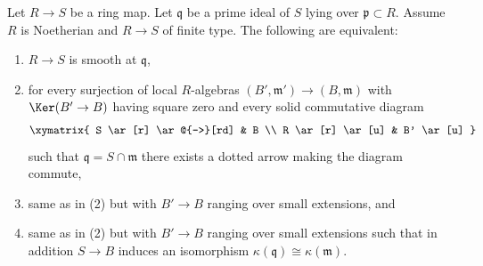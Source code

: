 %
\begin{lemma}
\label{lemma-smooth-test-artinian}
Let $R \to S$ be a ring map. Let $\mathfrak q$ be a prime ideal of
$S$ lying over $\mathfrak p \subset R$. Assume $R$ is Noetherian
and $R \to S$ of finite type.
The following are equivalent:
\begin{enumerate}
\item $R \to S$ is smooth at $\mathfrak q$,
\item for every surjection of local $R$-algebras
$(B', \mathfrak m') \to (B, \mathfrak m)$
with $\Ker(B' \to B)$ having square zero
and every solid commutative diagram
$$
\xymatrix{
S \ar[r] \ar@{-->}[rd] & B \\
R \ar[r] \ar[u] & B' \ar[u]
}
$$
such that $\mathfrak q = S \cap \mathfrak m$ there exists a dotted
arrow making the diagram commute,
\item same as in (2) but with $B' \to B$ ranging over small extensions, and
\item same as in (2) but with $B' \to B$ ranging over small extensions
such that in addition $S \to B$ induces an isomorphism
$\kappa(\mathfrak q) \cong \kappa(\mathfrak m)$.
\end{enumerate}
\end{lemma}

